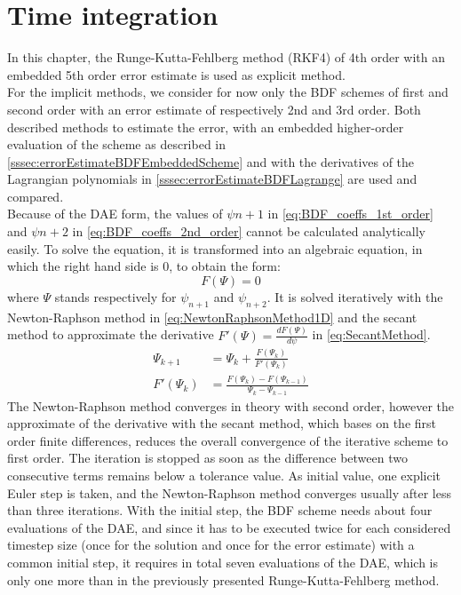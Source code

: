 \section{Time integration}
In this chapter, the Runge-Kutta-Fehlberg method (RKF4) of 4th order with an embedded 5th order error estimate is used as explicit method. \\
For the implicit methods, we consider for now only the BDF schemes of first and second order with an error estimate of respectively 2nd and 3rd order. Both described methods to estimate the error, with an embedded higher-order evaluation of the scheme as described in \autoref{sssec:errorEstimateBDFEmbeddedScheme} and with the derivatives of the Lagrangian polynomials in \autoref{sssec:errorEstimateBDFLagrange} are used and compared. \\
Because of the DAE form, the values of $\psi{n+1}$ in \autoref{eq:BDF_coeffs_1st_order} and $\psi{n+2}$ in \autoref{eq:BDF_coeffs_2nd_order} cannot be calculated analytically easily. To solve the equation, it is transformed into an algebraic equation, in which the right hand side is 0, to obtain the form:
\begin{equation}
F(\Psi) = 0
\end{equation}
where $\Psi$ stands respectively for $\psi_{n+1}$ and $\psi_{n+2}$. It is solved iteratively with the Newton-Raphson method \cite{NewtonRaphsonMethod} in \autoref{eq:NewtonRaphsonMethod1D} and the secant method to approximate the derivative $F'(\Psi) = \frac{d F(\Psi)}{d\psi}$ in \autoref{eq:SecantMethod}. 
\begin{align}
\label{eq:NewtonRaphsonMethod1D}
\Psi_{k+1} &= \Psi_{k} + \frac{F\left(\Psi_k\right)}{F'\left(\Psi_k\right)} \\
\label{eq:SecantMethod}
F'\left(\Psi_k\right) &= \frac{F\left(\Psi_{k}\right) - F\left(\Psi_{k-1}\right)}{\Psi_{k} - \Psi_{k-1}}
\end{align}
The Newton-Raphson method converges in theory with second order, however the approximate of the derivative with the secant method, which bases on the first order finite differences, reduces the overall convergence of the iterative scheme to first order. The iteration is stopped as soon as the difference between two consecutive terms remains below a tolerance value. As initial value, one explicit Euler step is taken, and the Newton-Raphson method converges usually after less than three iterations. With the initial step, the BDF scheme needs about four evaluations of the DAE, and since it has to be executed twice for each considered timestep size (once for the solution and once for the error estimate) with a common initial step, it requires in total seven evaluations of the DAE, which is only one more than in the previously presented Runge-Kutta-Fehlberg method. \\

